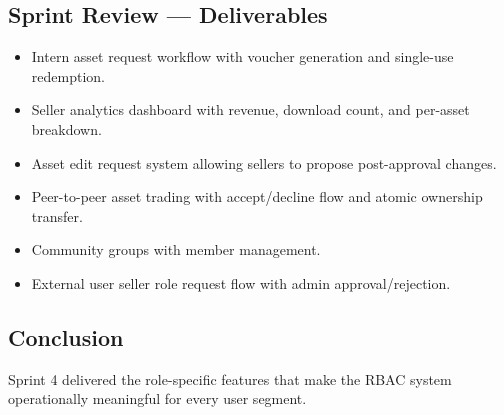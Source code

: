 \subsection{Sprint Review --- Deliverables}

\begin{itemize}
  \item Intern asset request workflow with voucher generation and single-use redemption.
  \item Seller analytics dashboard with revenue, download count, and per-asset breakdown.
  \item Asset edit request system allowing sellers to propose post-approval changes.
  \item Peer-to-peer asset trading with accept/decline flow and atomic ownership transfer.
  \item Community groups with member management.
  \item External user seller role request flow with admin approval/rejection.
\end{itemize}

\subsection*{Conclusion}
Sprint 4 delivered the role-specific features that make the RBAC system operationally meaningful for every user segment.
